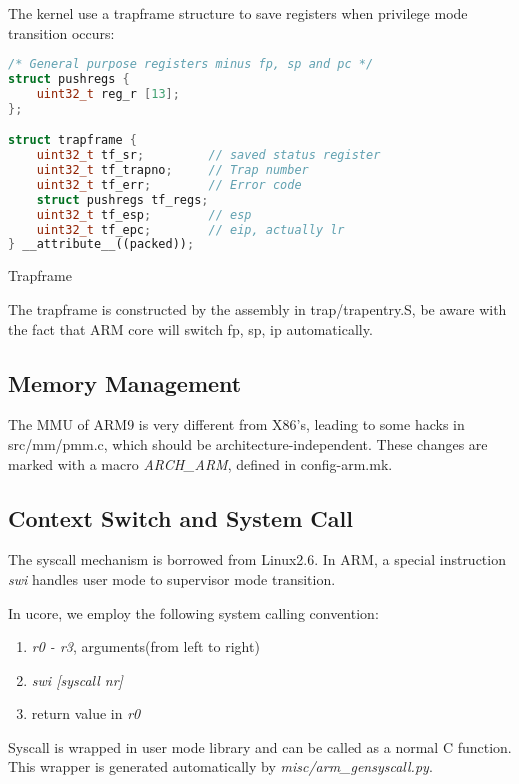 \documentclass[a4paper]{article}
\begin{document}
The kernel use a trapframe structure to save registers when privilege mode transition occurs:
\begin{algorithm}[h]
   \begin{lstlisting}[language={C++}]
/* General purpose registers minus fp, sp and pc */
struct pushregs {
    uint32_t reg_r [13];
};

struct trapframe {
	uint32_t tf_sr;			// saved status register
	uint32_t tf_trapno;		// Trap number
	uint32_t tf_err;		// Error code
	struct pushregs tf_regs;
	uint32_t tf_esp;		// esp
	uint32_t tf_epc;		// eip, actually lr
} __attribute__((packed));

\end{lstlisting}
\caption{Trapframe}
\end{algorithm}

The trapframe is constructed by the assembly in trap/trapentry.S, be aware with the fact that
ARM core will switch fp, sp, ip automatically.

\subsection{Memory Management}
\label{sec:mm}
The MMU of ARM9 is very different from X86's, leading to some hacks in src/mm/pmm.c,
which should be architecture-independent. These changes are marked with a macro
\emph{ARCH\_ARM}, defined in config-arm.mk.


\subsection{Context Switch and System Call}
The syscall mechanism is borrowed from Linux2.6. In ARM, a special 
instruction \emph{swi} handles user mode to supervisor mode transition.

In ucore, we employ the following system calling convention:
\begin{enumerate}
  \item \emph{r0 - r3}, arguments(from left to right)
  \item \emph{swi [syscall nr]}
  \item return value in \emph{r0}
\end{enumerate}

Syscall is wrapped in user mode library and can be called as a normal 
C function. This wrapper is generated automatically by 
\emph{misc/arm\_gensyscall.py}.
\end{document}
